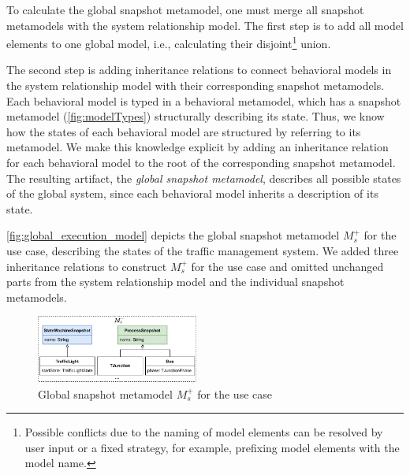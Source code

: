 \documentclass{jot}
\begin{document}
To calculate the global snapshot metamodel, one must merge all snapshot metamodels with the system relationship model.
The first step is to add all model elements to one global model, i.e., calculating their disjoint\footnote{Possible conflicts due to the naming of model elements can be resolved by user input or a fixed strategy, for example, prefixing model elements with the model name.} union.

The second step is adding inheritance relations to connect behavioral models in the system relationship model with their corresponding snapshot metamodels.
Each behavioral model is typed in a behavioral metamodel, which has a snapshot metamodel (\autoref{fig:modelTypes}) structurally describing its state.
Thus, we know how the states of each behavioral model are structured by referring to its metamodel.
We make this knowledge explicit by adding an inheritance relation for each behavioral model to the root of the corresponding snapshot metamodel.
The resulting artifact, the \emph{global snapshot metamodel}, describes all possible states of the global system, since each behavioral model inherits a description of its state.

\autoref{fig:global_execution_model} depicts the global snapshot metamodel $M_s^+$ for the use case, describing the states of the traffic management system.
We added three inheritance relations to construct $M_s^+$ for the use case and omitted unchanged parts from the system relationship model and the individual snapshot metamodels.

\begin{figure}[h]
    \centering
    \includegraphics[width=0.475\textwidth]{figures/global_s_model.pdf}
    \caption{Global snapshot metamodel $M_s^+$ for the use case}
    \label{fig:global_execution_model}
\end{figure}
\end{document}
